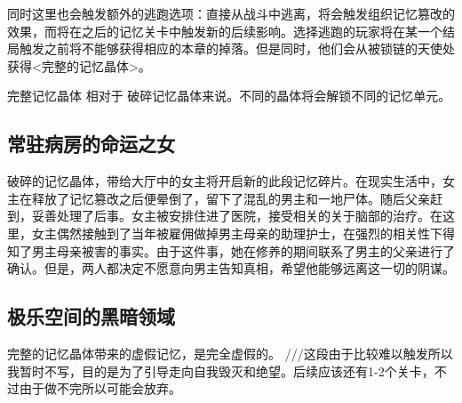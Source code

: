 \documentclass[12pt, a4paper]{article}
\begin{document}
            同时这里也会触发额外的逃跑选项：直接从战斗中逃离，将会触发组织记忆篡改的效果，而将在之后的记忆关卡中触发新的后续影响。选择逃跑的玩家将在某一个结局触发之前将不能够获得相应的本章的掉落。但是同时，他们会从被锁链的天使处获得<完整的记忆晶体>。

            完整记忆晶体 相对于 破碎记忆晶体来说。不同的晶体将会解锁不同的记忆单元。

    \subsection*{常驻病房的命运之女}
            
            破碎的记忆晶体，带给大厅中的女主将开启新的此段记忆碎片。在现实生活中，女主在释放了记忆篡改之后便晕倒了，留下了混乱的男主和一地尸体。随后父亲赶到，妥善处理了后事。女主被安排住进了医院，接受相关的关于脑部的治疗。在这里，女主偶然接触到了当年被雇佣做掉男主母亲的助理护士，在强烈的相关性下得知了男主母亲被害的事实。由于这件事，她在修养的期间联系了男主的父亲进行了确认。但是，两人都决定不愿意向男主告知真相，希望他能够远离这一切的阴谋。

    \subsection*{} 


    \subsection*{极乐空间的黑暗领域}
            
            完整的记忆晶体带来的虚假记忆，是完全虚假的。
            ///这段由于比较难以触发所以我暂时不写，目的是为了引导走向自我毁灭和绝望。后续应该还有1-2个关卡，不过由于做不完所以可能会放弃。
            
\end{document}
